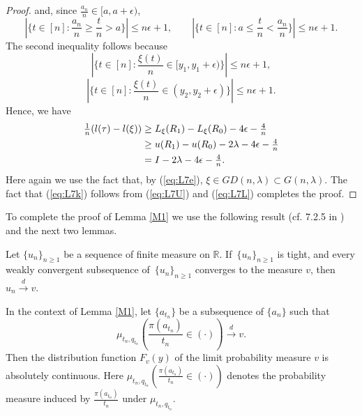 \begin{proof}
and, since $\frac{a_n}{n}\in [a, a + \epsilon)$,
\[
\textstyle|\{t\in [n]: \frac{a_n}{n} \ge \frac{t}{n} > a\}| \le n\epsilon +1,
\qquad |\{t\in[n]: a \le \frac{t}{n} < \frac{a_n}{n}\}| \le n\epsilon +1.
\]
The second inequality follows because
\[
\textstyle|\{t \in [n] : \frac{\xi(t)}{n} \in [y_1, y_1+\epsilon)  \}| \le n\epsilon +1,
\]
\[
\textstyle|\{t \in [n] : \frac{\xi(t)}{n} \in (y_2, y_2+\epsilon) \}| \le n\epsilon +1.
\]
Hence, we have
\begin{align}
\textstyle\frac{1}{n}(l(\tau) - l(\xi))
&\textstyle\ge L_{\xi}(R_1 ) - L_{\xi}(R_0) - 4\epsilon - \frac{4}{n}   \label{eq:L7L}\\
&\textstyle\ge u(R_1) - u(R_0) - 2\lambda - 4\epsilon - \frac{4}{n}  \nonumber\\
&\textstyle= I - 2\lambda - 4\epsilon - \frac{4}{n}. \nonumber
\end{align}
Here again we use the fact that, by (\ref{eq:L7e}), $\xi \in GD(n, \lambda) \subset G(n, \lambda)$.
The fact that (\ref{eq:L7k}) follows from (\ref{eq:L7U}) and (\ref{eq:L7L}) completes the proof.

\end{proof}



To complete the proof of Lemma \ref{M1} we use the following result (cf. 7.2.5 in \cite{Ash}) and the next two lemmas.

\begin{theorem} \label{thm:AshDade}
Let $\{u_n\}_{n \ge 1}$ be a sequence of finite measure on $\mathbb{R}$. If\, $\{u_n\}_{n \ge 1}$ is tight, and every weakly convergent
subsequence of \,$\{u_n\}_{n \ge 1}$ converges to the measure $v$, then $u_n \overset{d}{\longrightarrow} v$.
\end{theorem}





\begin{lemma}\label{L4}
In the context of Lemma \ref{M1}, let
$\{a_{t_n}\}$ be a subsequence of $\{a_n\}$ such that
\[
\mu_{t_n, q_{t_n}} \left( \frac{\pi(a_{t_n})}{t_n} \in ( \cdot ) \right) \overset{d}{\longrightarrow} v.
\]
Then the distribution function $F_v(y)$ of the limit probability measure $v$ is absolutely continuous. Here
$\mu_{t_n, q_{t_n}} \left( \frac{\pi(a_{t_n})}{t_n} \in ( \cdot ) \right)$ denotes the probability measure induced by
$\frac{\pi(a_{t_n})}{t_n}$ under $\mu_{t_n, q_{t_n}}$.
\end{lemma}

